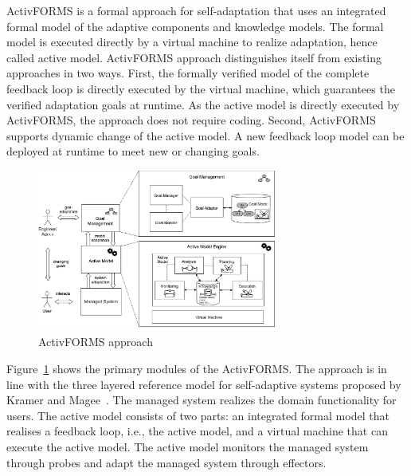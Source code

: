 ActivFORMS is a formal approach for self-adaptation that uses an integrated formal model of the adaptive components and knowledge models. The formal model is executed directly by a virtual machine to realize adaptation, hence called active model. ActivFORMS approach distinguishes itself from existing approaches in two ways. First, the formally verified model of the complete feedback loop is directly executed by the virtual machine, which guarantees the verified adaptation goals at runtime. As the active model is directly executed by ActivFORMS, the approach does not require coding. Second, ActivFORMS supports dynamic change of the active model. A new feedback loop model can be deployed at runtime to meet new or changing goals. 

\begin{figure}[b!]
	\centering
	\includegraphics[width=0.7\textwidth]{figures/ActivFORMS-approach.png}
	\caption{ActivFORMS approach}\label{fig:activforms}
\end{figure}

Figure~\ref{fig:activforms} shows the primary modules of the ActivFORMS. The approach is in line with the three layered reference model for self-adaptive systems proposed by Kramer and Magee~\cite{Kramer2007:FOSE}. The managed system realizes the domain functionality for users. The active model consists of two parts: an integrated formal model that realises a feedback loop, i.e., the active model, and a virtual machine that can execute the active model. The active model monitors the managed system through probes and adapt the managed system through effectors. 

